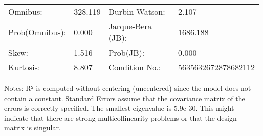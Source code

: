 \begin{table}
\begin{center}
\begin{tabular}{llll}
\hline
Omnibus:       & 328.119 & Durbin-Watson:    & 2.107                \\
Prob(Omnibus): & 0.000   & Jarque-Bera (JB): & 1686.188             \\
Skew:          & 1.516   & Prob(JB):         & 0.000                \\
Kurtosis:      & 8.807   & Condition No.:    & 5635632672878682112  \\
\hline
\end{tabular}
\end{center}
\end{table}
\bigskip
Notes: \newline 
[1] R² is computed without centering (uncentered) since the                 model does not contain a constant. \newline 
[2] Standard Errors assume that the covariance matrix of the errors is correctly specified. \newline 
[3] The smallest eigenvalue is 5.9e-30. This might indicate that                there are strong multicollinearity problems or that the design                matrix is singular.